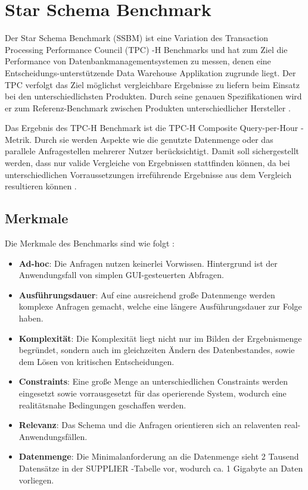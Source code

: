 \chapter{Star Schema Benchmark}\label{chapter:ssbm}

Der Star Schema Benchmark (SSBM) ist eine Variation des Transaction Processing Performance Council (TPC) -H Benchmarks und hat zum Ziel die Performance von Datenbankmanagementsystemen zu messen, denen eine Entscheidungs-unterstützende Data Warehouse Applikation zugrunde liegt. Der TPC verfolgt das Ziel möglichst vergleichbare Ergebnisse zu liefern beim Einsatz bei den unterschiedlichsten Produkten. Durch seine genauen  Spezifikationen wird er zum Referenz-Benchmark zwischen Produkten unterschiedlicher Hersteller \cite[vgl.][]{tpch2}. 

Das Ergebnis des TPC-H Benchmark ist die {\glqq}TPC-H Composite Query-per-Hour{\grqq} -Metrik. Durch sie werden Aspekte wie die genutzte Datenmenge oder das parallele Anfragestellen mehrerer Nutzer berücksichtigt. Damit soll sichergestellt werden, dass nur valide Vergleiche von Ergebnissen stattfinden können, da bei unterschiedlichen Vorraussetzungen irreführende Ergebnisse aus dem Vergleich resultieren können \cite[vgl.][]{tpch2}. 

\section{Merkmale}
Die Merkmale des Benchmarks sind wie folgt \cite[vgl.][]{tpch3}: 
\begin{itemize}
	\item \textbf{Ad-hoc}: Die Anfragen nutzen keinerlei Vorwissen. Hintergrund ist der Anwendungsfall von simplen GUI-gesteuerten Abfragen. 
	\item \textbf{Ausführungsdauer}: Auf eine ausreichend große Datenmenge werden komplexe Anfragen gemacht, welche eine längere Ausführungsdauer zur Folge haben. 
	\item \textbf{Komplexität}: Die Komplexität liegt nicht nur im Bilden der Ergebnismenge begründet, sondern auch im gleichzeiten Ändern des Datenbestandes, sowie dem Lösen von kritischen Entscheidungen. 
	\item \textbf{Constraints}: Eine große Menge an unterschiedlichen Constraints werden eingesetzt sowie vorrausgesetzt für das operierende System, wodurch eine realitätsnahe Bedingungen geschaffen werden. 
	\item \textbf{Relevanz}: Das Schema und die Anfragen orientieren sich an relaventen real-Anwendungsfällen. 
	\item \textbf{Datenmenge}: Die Minimalanforderung an die Datenmenge sieht 2 Tausend Datensätze in der {\glqq}SUPPLIER{\grqq} -Tabelle vor, wodurch ca. 1 Gigabyte an Daten vorliegen. 
\end{itemize}

